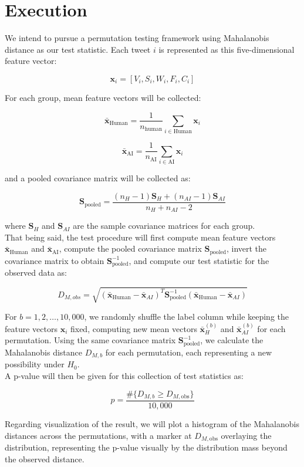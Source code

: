 \section*{Execution}

We intend to pursue a permutation testing framework using Mahalanobis distance as our test statistic. Each tweet $i$ is represented as this five-dimensional feature vector:

$$ \mathbf{x}_i = [V_i, S_i, W_i, F_i, C_i ] $$

For each group, mean feature vectors will be collected:

$$ \bar{\mathbf{x}}_{\text{Human}} = \frac{1}{n_\text{human}} \sum_{i \in \text{Human}} \mathbf{x}_i $$

$$ \bar{\mathbf{x}}_{\text{AI}} = \frac{1}{n_\text{AI}} \sum_{i \in \text{AI}} \mathbf{x}_i $$

and a pooled covariance matrix will be collected as:

$$
\mathbf{S}_{\text{pooled}} = \frac{(n_H - 1)\mathbf{S}_H + (n_{AI} - 1)\mathbf{S}_{AI}}{n_H + n_{AI} - 2}
$$

where $\mathbf{S}_H$ and $\mathbf{S}_{AI}$ are the sample covariance matrices for each group.\\

That being said, the test procedure will first compute mean feature vectors $ \bar{\mathbf{x}}_{\text{Human}} $ and $ \bar{\mathbf{x}}_{\text{AI}} $, compute the pooled covariance matrix $\mathbf{S}_{\text{pooled}}$, invert the covariance matrix to obtain $\mathbf{S}_{\text{pooled}}^{-1}$, and compute our test statistic for the observed data as:

$$ D_{M,obs} = \sqrt{(\bar{\mathbf{x}}_\text{Human} - \bar{\mathbf{x}}_{AI})^T \mathbf{S}_{\text{pooled}}^{-1} (\bar{\mathbf{x}}_\text{Human} - \bar{\mathbf{x}}_{AI})} $$

For $b = 1, 2, \ldots, 10,000$, we randomly shuffle the label column while keeping the feature vectors $\mathbf{x}_i$ fixed, computing new mean vectors $\bar{\mathbf{x}}_H^{(b)}$ and $\bar{\mathbf{x}}_{AI}^{(b)}$ for each permutation. Using the same covariance matrix $\mathbf{S}_{\text{pooled}}^{-1}$, we calculate the Mahalanobis distance $ D_{M, b} $ for each permutation, each representing a new possibility under $ H_0 $.\\

A p-value will then be given for this collection of test statistics as:

$$ p = \frac{\#\{D_{M,b} \geq D_{M,\text{obs}}\}}{10,000} $$

Regarding visualization of the result, we will plot a histogram of the Mahalanobis distances across the permutations, with a marker at $ D_{M,\text{obs}} $ overlaying the distribution, representing the p-value visually by the distribution mass beyond the observed distance.
